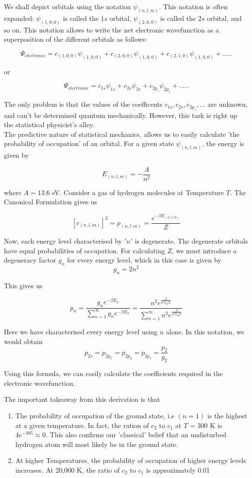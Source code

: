 \documentclass[oneside]{book}
\begin{document}
We shall depict orbitals using the notation $\psi_{(n,l,m)}$. This notation is often expanded: $\psi_{(1,0,0)}$ is called the $1s$ orbital, $\psi_{(2,0,0)}$ is called the $2s$ orbital, and so on. This notation allows to write the net electronic wavefunction as a superposition of the different orbitals as follows:

\[ \Psi_{electronic} =  c_{(1,0,0)}\psi_{(1,0,0)} + c_{(2,0,0)}\psi_{(1,0,0)} + c_{(2,1,0)}\psi_{(1,0,0)} + .....\] 

or

\[ \Psi_{electronic} =  c_{1s}\psi_{1s} + c_{2s}\psi_{2s} + c_{2p_z}\psi_{2p_z} + .....\] 

The only problem is that the values of the coefficents $ c_{1s}, c_{2s},c_{2p_z},...$  are unknown, and can't be determined quantum mechanically. However, this task is right up the statistical physicist's alley.\\

The predictive nature of statistical mechanics, allows us to easily calculate 'the probability of occupation' of an orbital. For a given state $\psi_{(n,l,m)}$, the energy is given by 

\[  E_{(n,l,m)} = -\frac{A}{n^2}  \]

where $A = 13.6$ eV. Consider a gas of hydrogen molecules at Temperature $T$. The Canonical Formulation gives us

\[[c_{(n,l,m)}]^2 = p_{(n,l,m)} = \frac{e^{-\beta E_{(n,l,m)}}}{Z} \]

Now, each energy level characterised by $'n'$ is degenerate. The degenerate orbitals have equal probabilities of occupation. For calculating $Z$, we must introduce a degeneracy factor $g_n$ for every energy level, which in this case is given by
\[g_n = 2n^2 \]

 This gives us

\[ p_n = \frac{g_ne^{ -\beta E_n } }{ \sum_{n = 1}^{\infty}g_ne^{ -\beta E_n}  } = \frac{n^2e^{ \frac{A}{n^2k_BT} } }{ \sum_{n = 1}^{\infty}n^2e^{ \frac{A}{n^2k_BT} } }  \]

Here we have characterised every energy level using $n$ alone. In this notation, we would obtain \[ p_{2s} = p_{2p_x} = p_{2p_y} = p_{2p_z} = \frac{p_{2}}{g_2}\]

Using this formula, we can easily calculate the coefficients required in the electronic wavefunction. 


The important takeaway from this derivation is that 
\begin{enumerate}
\item The probability of occupation of the ground state, i.e $(n =1)$ is the highest at a given temperature. In fact, the ration of $c_{2}$ to $c_{1}$ at $T$ = 300 K is $4e^{-395} \approx 0$. This also confirms our 'classical' belief that an undisturbed hydrogen atom will most likely be in the ground state. 
\item At higher Temperatures, the probability of occupation of higher energy levels increases. At 20,000 K, the ratio of $c_{2}$ to $c_{1}$ is approximately 0.01
\end{enumerate}
\end{document}
